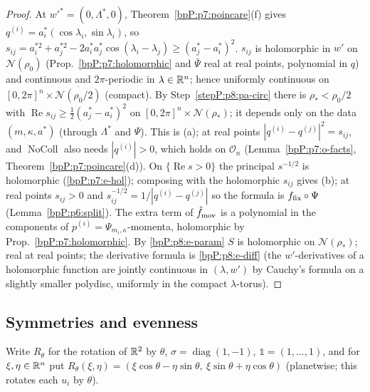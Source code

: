 \begin{proof}
\label{stepP:p8:pa-circ} At $w'^*=(0,\Lambda^*,0)$, Theorem~\ref{bpP:p7:poincare}(f) gives $q^{(i)}=a_i^*(\cos\lambda_i,\sin\lambda_i)$, so $s_{ij}=a_i^{*2}+a_j^{*2}-2a_i^*a_j^*\cos(\lambda_i-\lambda_j)\ge(a_j^*-a_i^*)^2$.
\label{stepP:p8:pa-unif} $s_{ij}$ is holomorphic in $w'$ on $\mathcal N(\rho_0)$ (Prop.~\ref{bpP:p7:holomorphic} and $\bar\Psi$ real at real points, polynomial in $q$) and continuous and $2\pi$-periodic in $\lambda\in\mathbb{R}^n$; hence uniformly continuous on $[0,2\pi]^n\times\overline{\mathcal N(\rho_0/2)}$ (compact). By Step~\ref{stepP:p8:pa-circ} there is $\rho_*<\rho_0/2$ with $\operatorname{Re}s_{ij}\ge\tfrac12(a_j^*-a_i^*)^2$ on $[0,2\pi]^n\times\mathcal N(\rho_*)$; it depends only on the data $(m,\kappa,a^*)$ (through $\Lambda^*$ and $\Psi$). This is (a); at real points $|q^{(i)}-q^{(j)}|^2=s_{ij}$, and $\operatorname{NoColl}$ also needs $|q^{(i)}|>0$, which holds on $\mathcal O_n$ (Lemma~\ref{bpP:p7:o-facts}, Theorem~\ref{bpP:p7:poincare}(d)).
\label{stepP:p8:pa-hol} On $\{\operatorname{Re}s>0\}$ the principal $s^{-1/2}$ is holomorphic (\ref{bpP:p7:e-hol}); composing with the holomorphic $s_{ij}$ gives (b); at real points $s_{ij}>0$ and $s_{ij}^{-1/2}=1/|q^{(i)}-q^{(j)}|$ so the formula is $f_{\rm fix}\circ\Psi$ (Lemma~\ref{bpP:p6:split}). The extra term of $\hat f_{\rm mov}$ is a polynomial in the components of $p^{(i)}=\Psi_{m_i,\kappa}$-momenta, holomorphic by Prop.~\ref{bpP:p7:holomorphic}.
\label{stepP:p8:pa-avg} By \ref{bpP:p8:e-param} $S$ is holomorphic on $\mathcal N(\rho_*)$; real at real points; the derivative formula is \ref{bpP:p8:e-diff} (the $w'$-derivatives of a holomorphic function are jointly continuous in $(\lambda,w')$ by Cauchy's formula on a slightly smaller polydisc, uniformly in the compact $\lambda$-torus).
\end{proof}

\subsection{Symmetries and evenness}\label{bpP:p8:sec-sym}

Write $R_\theta$ for the rotation of $\mathbb{R}^2$ by $\theta$, $\sigma=\operatorname{diag}(1,-1)$, $\mathbb 1=(1,\dots,1)$, and for $\xi,\eta\in\mathbb{R}^n$ put $R_\theta(\xi,\eta)=(\xi\cos\theta-\eta\sin\theta,\ \xi\sin\theta+\eta\cos\theta)$ (planetwise; this rotates each $u_i$ by $\theta$).

